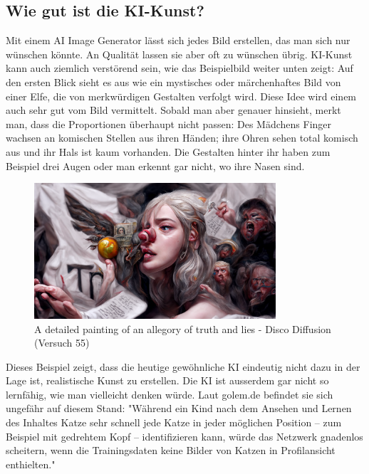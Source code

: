\documentclass{article}
\begin{document}
    \subsection{Wie gut ist die KI-Kunst?}  
    Mit einem AI Image Generator lässt sich jedes Bild erstellen, das man sich nur wünschen könnte. 
        An Qualität lassen sie aber oft zu wünschen übrig. 
        KI-Kunst kann auch ziemlich verstörend sein, wie das Beispielbild weiter unten zeigt: Auf den ersten Blick sieht es aus wie ein mystisches oder märchenhaftes Bild von einer Elfe, die von merkwürdigen Gestalten verfolgt wird. Diese Idee wird einem auch sehr gut vom Bild vermittelt. Sobald man aber genauer hinsieht, merkt man, dass die Proportionen überhaupt nicht passen: Des Mädchens Finger wachsen an komischen Stellen aus ihren Händen; ihre Ohren sehen total komisch aus und ihr Hals ist kaum vorhanden. Die Gestalten hinter ihr haben zum Beispiel drei Augen oder man erkennt gar nicht, wo ihre Nasen sind. 
        \begin{figure}[ht]
        \centering        
        \includegraphics[width=0.8\textwidth]{ki-bild.png} 
        \caption{A detailed painting of an allegory of truth and lies - Disco Diffusion (Versuch 55)}
        \label{fig:ki-bild}
        \end{figure}
        Dieses Beispiel zeigt, dass die heutige gewöhnliche KI eindeutig nicht dazu in der Lage ist, realistische Kunst zu erstellen.
        \newline Die KI ist ausserdem gar nicht so lernfähig, wie man vielleicht denken würde. Laut golem.de befindet sie sich ungefähr auf diesem Stand: "Während ein Kind nach dem Ansehen und Lernen des Inhaltes Katze sehr schnell jede Katze in jeder möglichen Position – zum Beispiel mit gedrehtem Kopf – identifizieren kann, würde das Netzwerk gnadenlos scheitern, wenn die Trainingsdaten keine Bilder von Katzen in Profilansicht enthielten." 

\newpage
\end{document}
